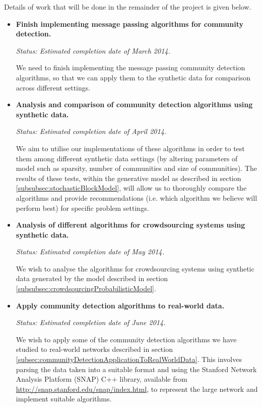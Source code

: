 \documentclass[12pt]{article}
\numberwithin{equation}{section}
\begin{document}
Details of work that will be done in the remainder of the project is given below.
\begin{itemize}
	\item \textbf{Finish implementing message passing algorithms for community detection.}

	\textit{Status: Estimated completion date of March 2014.}	

	We need to finish implementing the message passing community detection algorithms, so that we can apply them to the synthetic data for comparison across different settings.

	\item \textbf{Analysis and comparison of community detection algorithms using synthetic data.}

	\textit{Status: Estimated completion date of April 2014.}	

	We aim to utilise our implementations of these algorithms in order to test them among different synthetic data settings (by altering parameters of model such as sparsity, number of communities and size of communities). The results of these tests, within the generative model as described in section \ref{subsubsec:stochasticBlockModel}, will allow us to thoroughly compare the algorithms and provide recommendations (i.e. which algorithm we believe will perform best) for specific problem settings.

	\item \textbf{Analysis of different algorithms for crowdsourcing systems using synthetic data.}

	\textit{Status: Estimated completion date of May 2014.}	

	We wish to analyse the algorithms for crowdsourcing systems using synthetic data generated by the model described in section \ref{subsubsec:crowdsourcingProbabilisticModel}.

	\item \textbf{Apply community detection algorithms to real-world data.}

	\textit{Status: Estimated completion date of June 2014.}	

	We wish to apply some of the community detection algorithms we have studied to real-world networks described in section \ref{subsec:communityDetectionApplicationToRealWorldData}. This involves parsing the data taken into a suitable format and using the Stanford Network Analysis Platform (SNAP) C++ library, available from \url{http://snap.stanford.edu/snap/index.html}, to represent the large network and implement suitable algorithms.
\end{itemize}
\end{document}
